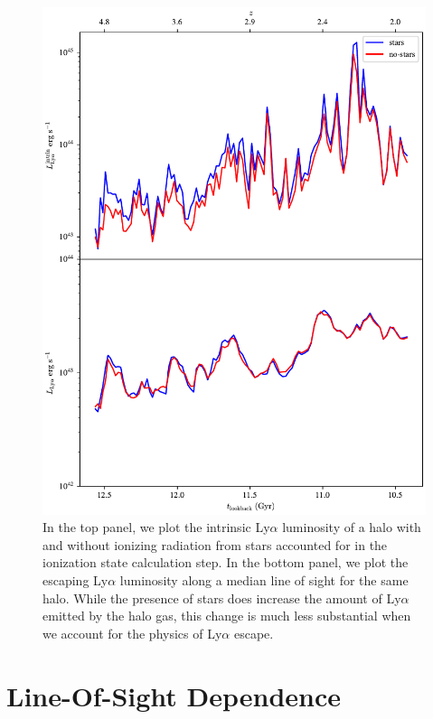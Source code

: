 \begin{figure}
    \centering
    \includegraphics[width=\textwidth,height=0.85\textheight,keepaspectratio]{figures/stars.pdf}
    \caption{
        In the top panel, we plot the intrinsic Ly$\alpha$ luminosity of a halo with and without ionizing radiation from stars accounted for in the ionization state calculation step.
        In the bottom panel, we plot the escaping Ly$\alpha$ luminosity along a median line of sight for the same halo.
        While the presence of stars does increase the amount of Ly$\alpha$ emitted by the halo gas, this change is much less substantial when we account for the physics of Ly$\alpha$ escape.
    }
    \label{fig:stars}
\end{figure}


\section{Line-Of-Sight Dependence}
\label{sec:los}

